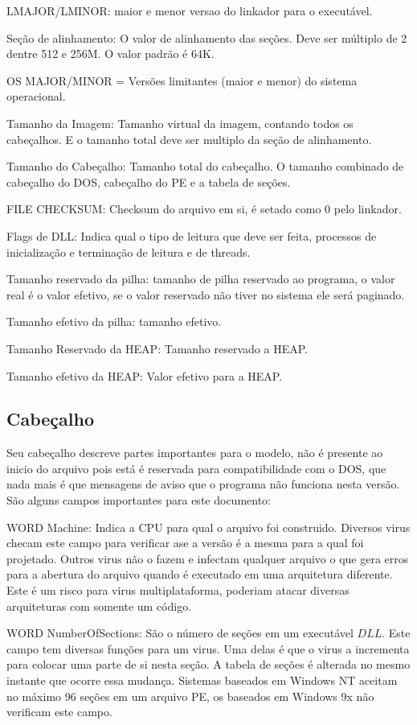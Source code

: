 LMAJOR/LMINOR: maior e menor versao do linkador para o executável.


Seção de alinhamento: O valor de alinhamento das seções. Deve ser
múltiplo de 2 dentre 512 e 256M. O valor padrão é 64K.


OS MAJOR/MINOR = Versões limitantes (maior e menor) do sistema operacional.


Tamanho da Imagem: Tamanho virtual da imagem, contando todos os cabeçalhos.
E o tamanho total deve ser multiplo da seção de alinhamento.


Tamanho do Cabeçalho: Tamanho total do cabeçalho. O tamanho combinado
de cabeçalho do DOS, cabeçalho do PE e a tabela de seções.


FILE CHECKSUM: Checksum do arquivo em si, é setado como 0 pelo linkador.


Flags de DLL: Indica qual o tipo de leitura que deve ser feita, processos
de inicialização e terminação de leitura e de threads.


Tamanho reservado da pilha: tamanho de pilha reservado ao programa,
o valor real é o valor efetivo, se o valor reservado não tiver no
sistema ele será paginado.


Tamanho efetivo da pilha: tamanho efetivo.


Tamanho Reservado da HEAP: Tamanho reservado a HEAP.


Tamanho efetivo da HEAP: Valor efetivo para a HEAP.


\subsection{Cabeçalho}

Seu cabeçalho descreve partes importantes para o modelo, não é presente ao inicio do arquivo pois está 
 é reservada para compatibilidade com o DOS, que nada mais é que mensagens de aviso que o programa
 não funciona nesta versão.
 São alguns campos importantes para este documento:
 
  
 WORD Machine: Indica a CPU para qual o arquivo foi construido. Diversos virus checam este
 campo para verificar ase a versão é a mesma para a qual foi projetado. Outros virus não o fazem
  e infectam qualquer arquivo o que gera erros para a abertura do arquivo quando é executado em
  uma arquitetura diferente. Este é um risco para virus multiplataforma, poderiam atacar
  diversas arquiteturas com somente um código.

WORD NumberOfSections: São o número de seções em um executável \(DLL\). Este campo tem 
 diversas funções para um virus. Uma delas é que o virus a incrementa para colocar uma 
 parte de si nesta seção. A tabela de seções é alterada no mesmo instante que ocorre essa
 mudança. Sistemas baseados em Windows NT aceitam no máximo 96 seções em um arquivo PE, 
 os baseados em Windows 9x não verificam este campo.

